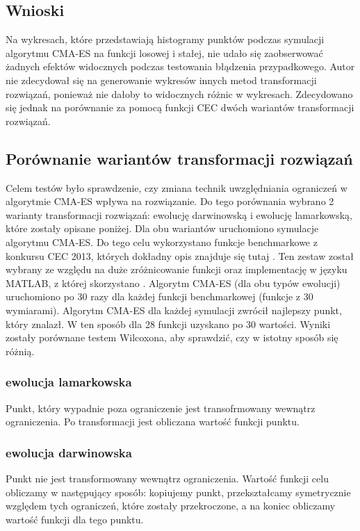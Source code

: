 \documentclass{mini}
\begin{document}
\subsection{Wnioski}
Na wykresach, które przedstawiają histogramy punktów podczas symulacji algorytmu CMA-ES na funkcji losowej i stałej, nie udało się zaobserwować żadnych efektów widocznych podczas testowania błądzenia przypadkowego. Autor nie zdecydował się na generowanie wykresów innych metod transformacji rozwiązań, ponieważ nie dałoby to widocznych różnic w wykresach. Zdecydowano się jednak na porównanie za pomocą funkcji CEC dwóch wariantów transformacji rozwiązań.

\subsection{Porównanie wariantów transformacji rozwiązań}
Celem testów było sprawdzenie, czy zmiana technik uwzględniania ograniczeń w algorytmie CMA-ES wpływa na rozwiązanie. Do tego porównania wybrano 2 warianty transformacji rozwiązań: ewolucję darwinowską i ewolucję lamarkowską, które zostały opisane poniżej. Dla obu wariantów uruchomiono symulacje algorytmu CMA-ES. Do tego celu wykorzystano funkcje benchmarkowe z konkursu CEC 2013, których dokładny opis znajduje się tutaj \cite{cec}. Ten zestaw został wybrany ze względu na duże zróżnicowanie funkcji oraz implementację w języku MATLAB, z której skorzystano \cite{cec_code}. Algorytm CMA-ES (dla obu typów ewolucji) uruchomiono po 30 razy dla każdej funkcji benchmarkowej (funkcje z 30 wymiarami). Algorytm CMA-ES dla każdej symulacji zwrócił najlepszy punkt, który znalazł. W ten sposób dla 28 funkcji uzyskano po 30 wartości. Wyniki zostały porównane testem Wilcoxona, aby sprawdzić, czy w istotny sposób się różnią.

\subsubsection*{ewolucja lamarkowska}
Punkt, który wypadnie poza ograniczenie jest transofrmowany wewnątrz ograniczenia. Po transformacji jest obliczana wartość funkcji punktu.

\subsubsection*{ewolucja darwinowska}
Punkt nie jest transformowany wewnątrz ograniczenia. Wartość funkcji celu obliczamy w następujący sposób: kopiujemy punkt, przekształcamy symetrycznie względem tych ograniczeń, które zostały przekroczone, a na koniec obliczamy wartość funkcji dla tego punktu.
\end{document}
